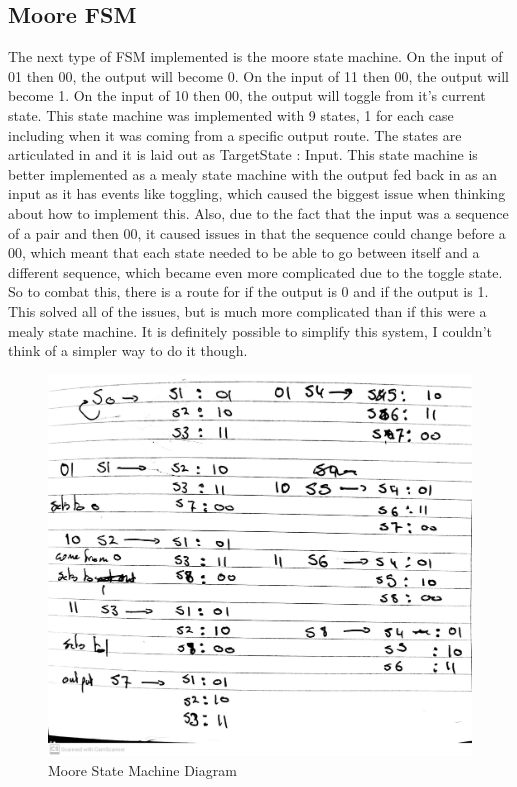 \documentclass[a4paper, 12pt]{article}
\begin{document}
		\subsection{Moore FSM}
			The next type of FSM implemented is the moore state machine. On the input of 01 then 00, the output will become 0. On the input of 11 then 00, the output will become 1. On the input of 10 then 00, the output will toggle from it's current state. This state machine was implemented with 9 states, 1 for each case including when it was coming from a specific output route. The states are articulated in  and it is laid out as TargetState : Input. This state machine is better implemented as a mealy state machine with the output fed back in as an input as it has events like toggling, which caused the biggest issue when thinking about how to implement this. Also, due to the fact that the input was a sequence of a pair and then 00, it caused issues in that the sequence could change before a 00, which meant that each state needed to be able to go between itself and a different sequence, which became even more complicated due to the toggle state. So to combat this, there is a route for if the output is 0 and if the output is 1. This solved all of the issues, but is much more complicated than if this were a mealy state machine. It is definitely possible to simplify this system, I couldn't think of a simpler way to do it though.
			\begin{figure}[!ht]
				\centering
				\includegraphics[width=\columnwidth]{Moore_FSM.jpg}
				\caption{Moore State Machine Diagram}
				\label{fig:mooreDiag}
			\end{figure}
\end{document}
